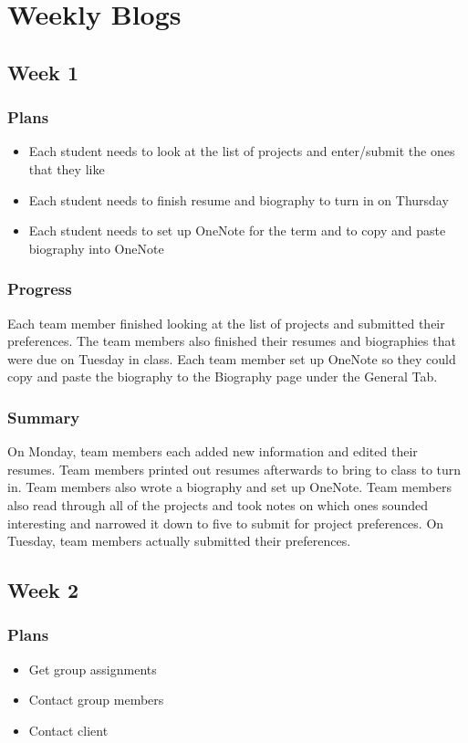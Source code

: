 \documentclass[onecolumn, draftclsnofoot,10pt, compsoc]{IEEEtran}
\begin{document}
\section{Weekly Blogs}

\subsection{Week 1}

\subsubsection{Plans}
\begin{itemize}
\item Each student needs to look at the list of projects and enter/submit the ones that they like
\item Each student needs to finish resume and biography to turn in on Thursday
\item Each student needs to set up OneNote for the term and to copy and paste biography into OneNote
\end{itemize}

\subsubsection{Progress}
Each team member finished looking at the list of projects and submitted their preferences. The team members also finished their resumes and biographies that were due on Tuesday in class. Each team member set up OneNote so they could copy and paste the biography to the Biography page under the General Tab. 

\subsubsection{Summary}
On Monday, team members each added new information and edited their resumes. Team members printed out resumes afterwards to bring to class to turn in. Team members also wrote a biography and set up OneNote. Team members also read through all of the projects and took notes on which ones sounded interesting and narrowed it down to five to submit for project preferences. On Tuesday, team members  actually submitted their preferences.

\subsection{Week 2}

\subsubsection{Plans}
\begin{itemize}
\item Get group assignments 
\item Contact group members
\item Contact client
\end{itemize}
\end{document}
